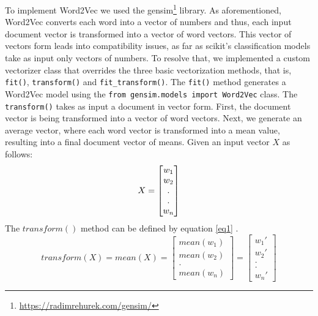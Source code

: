 To implement Word2Vec we used the gensim\footnote{\url{https://radimrehurek.com/gensim/}} library. As aforementioned, Word2Vec converts each word into a vector of numbers and thus, each input document vector is transformed into a vector of word vectors. This vector of vectors form leads into compatibility issues, as far as scikit's classification models take as input only vectors of numbers. To resolve that, we implemented a custom vectorizer class that overrides the three basic vectorization methods, that is, \texttt{fit()}, \texttt{transform()} and \texttt{fit\_transform()}. The \texttt{fit()} method generates a Word2Vec model using the \texttt{from gensim.models import Word2Vec} class. The \texttt{transform()} takes as input a document in vector form. First, the document vector is being transformed into a vector of word vectors. Next, we generate an average vector, where each word vector is transformed into a mean value, resulting into a final document vector of means. Given an input vector $X$ as follows:
\begin{equation*}
		X=
	\begin{bmatrix}
	w_1\\
	w_2\\
	.\\
	.\\
	w_n
	\end{bmatrix} 
	\space
\end{equation*}
The $transform()$ method  can be defined by equation \ref{eq1} .
\begin{equation}
\label{eq1}
	transform(X) = mean(X) =
	\begin{bmatrix}
	mean(w_1) \\
	mean(w_2) \\

	. \\
	mean(w_n)
	\end{bmatrix} 
	=
	\begin{bmatrix}
	w_1' \\
    w_2' \\
	. \\
	. \\
	w_n'
	\end{bmatrix} 
\end{equation}
